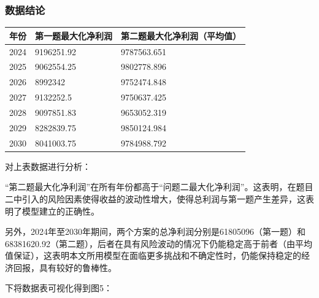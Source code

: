 \documentclass[withoutpreface]{cumcmthesis}
\begin{document}
\subsubsection{数据结论}
\begin{table}[H]
    \centering
    \begin{tabular}{|l|l|l|}
    \hline
    \textbf{年份} & \textbf{第一题最大化净利润} & \textbf{第二题最大化净利润（平均值）}  \\ \hline
        2024 & 9196251.92 & 9787563.651
        \\ \hline
        2025 & 9062554.25 & 9802778.896
        \\ \hline
        2026 & 8992342 & 9752474.848
        \\ \hline
        2027 & 9132252.5 & 9750637.425
        \\ \hline
        2028 & 9097851.83 & 9653052.319
        \\ \hline
        2029 & 8282839.75 & 9850124.984
        \\ \hline
        2030 & 8041003.75 & 9784988.792
        \\ \hline

    \end{tabular}
\end{table}
对上表数据进行分析：

“第二题最大化净利润”在所有年份都高于“问题二最大化净利润”。这表明，在题目二中引入的风险因素使得收益的波动性增大，使得总利润与第一题产生差异，这表明了模型建立的正确性。

另外，2024年至2030年期间，两个方案的总净利润分别是61805096（第一题）和68381620.92（第二题），后者在具有风险波动的情况下仍能稳定高于前者（由平均值保证），这表明本文所用模型在面临更多挑战和不确定性时，仍能保持稳定的经济回报，具有较好的鲁棒性。

下将数据表可视化得到图5：
\end{document}
